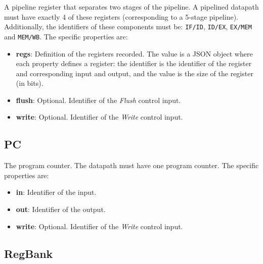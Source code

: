 \documentclass[11pt,a4paper,twoside,titlepage]{report}
\begin{document}
A pipeline register that separates two stages of the pipeline.
A pipelined datapath must have exactly 4 of these registers (corresponding to a
5-stage pipeline). Additionally, the identifiers of these components must be:
\verb+IF/ID+, \verb+ID/EX+, \verb+EX/MEM+ and \verb+MEM/WB+.
The specific properties are:
\begin{itemize}
	\item \textbf{regs}: Definition of the registers recorded. The value is a
		JSON object where each property defines a register: the identifier is
		the identifier of the register and corresponding input and output, and
		the value is the size of the register (in bits).
	\item \textbf{flush}: Optional. Identifier of the \textit{Flush} control input.
	\item \textbf{write}: Optional. Identifier of the \textit{Write} control input.
\end{itemize}

\subsection{PC}

The program counter. The datapath must have one program counter.
The specific properties are:
\begin{itemize}
	\item \textbf{in}: Identifier of the input.
	\item \textbf{out}: Identifier of the output.
	\item \textbf{write}: Optional. Identifier of the \textit{Write} control input.
\end{itemize}

\subsection{RegBank}
\end{document}
